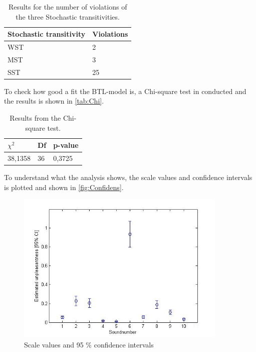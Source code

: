 \begin{table}[H]
\centering
\begin{tabular}{@{}ll@{}}
\toprule
Stochastic transitivity     & Violations \\ \midrule
WST      & 2   \\
MST      & 3   \\
SST      & 25   \\ \bottomrule
\end{tabular}
\caption{Results for the number of violations of the three Stochastic transitivities.}
\label{tab:Stocha}
\end{table} 

\noindent To check how good a fit the BTL-model is, a Chi-square test in conducted and the results is shown in \autoref{tab:Chi}. 

\begin{table}[H]
\centering
\begin{tabular}{@{}lll@{}}
\toprule
$\chi^{2}$     & Df & p-value \\ \midrule
38,1358      & 36  &  0,3725   \\ \bottomrule
\end{tabular}
\caption{Results from the Chi-square test.}
\label{tab:Chi}
\end{table} 

\noindent To understand what the analysis shows, the scale values and confidence intervals is plotted and shown in \autoref{fig:Confidens}. 

\begin{figure}[H]
\centering
\includegraphics[width = 0.90\textwidth]{Figure/Confidens.jpg} 
\caption{Scale values and 95 \% confidence intervals}
\label{fig:Confidens}
\end{figure}